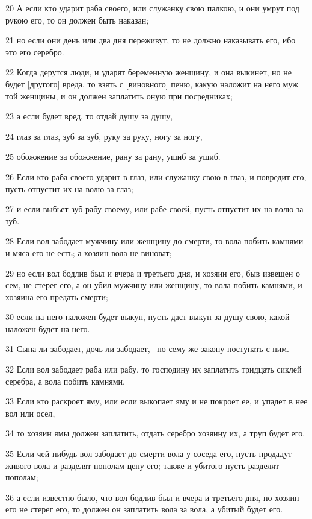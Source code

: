 \par 20 А если кто ударит раба своего, или служанку свою палкою, и они умрут под рукою его, то он должен быть наказан;
\par 21 но если они день или два дня переживут, то не должно наказывать его, ибо это его серебро.
\par 22 Когда дерутся люди, и ударят беременную женщину, и она выкинет, но не будет [другого] вреда, то взять с [виновного] пеню, какую наложит на него муж той женщины, и он должен заплатить оную при посредниках;
\par 23 а если будет вред, то отдай душу за душу,
\par 24 глаз за глаз, зуб за зуб, руку за руку, ногу за ногу,
\par 25 обожжение за обожжение, рану за рану, ушиб за ушиб.
\par 26 Если кто раба своего ударит в глаз, или служанку свою в глаз, и повредит его, пусть отпустит их на волю за глаз;
\par 27 и если выбьет зуб рабу своему, или рабе своей, пусть отпустит их на волю за зуб.
\par 28 Если вол забодает мужчину или женщину до смерти, то вола побить камнями и мяса его не есть; а хозяин вола не виноват;
\par 29 но если вол бодлив был и вчера и третьего дня, и хозяин его, быв извещен о сем, не стерег его, а он убил мужчину или женщину, то вола побить камнями, и хозяина его предать смерти;
\par 30 если на него наложен будет выкуп, пусть даст выкуп за душу свою, какой наложен будет на него.
\par 31 Сына ли забодает, дочь ли забодает, --по сему же закону поступать с ним.
\par 32 Если вол забодает раба или рабу, то господину их заплатить тридцать сиклей серебра, а вола побить камнями.
\par 33 Если кто раскроет яму, или если выкопает яму и не покроет ее, и упадет в нее вол или осел,
\par 34 то хозяин ямы должен заплатить, отдать серебро хозяину их, а труп будет его.
\par 35 Если чей-нибудь вол забодает до смерти вола у соседа его, пусть продадут живого вола и разделят пополам цену его; также и убитого пусть разделят пополам;
\par 36 а если известно было, что вол бодлив был и вчера и третьего дня, но хозяин его не стерег его, то должен он заплатить вола за вола, а убитый будет его.

